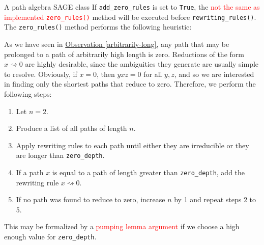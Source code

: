 \begin{chapter}{A path algebra SAGE class}
If \texttt{add\_zero\_rules} is set to \texttt{True}, the \textcolor{red}{not the same as implemented \texttt{zero\_rules()}} method will be executed before \texttt{rewriting\_rules()}. The \texttt{zero\_rules()} method performs the following heuristic:
\begin{heur} As we have seen in \hyperref[arbitrarily-long]{Observation \ref*{arbitrarily-long}},  any path that may be prolonged to a path of arbitrarily high length is zero. Reductions of the form $x\rightsquigarrow 0$ are highly desirable, since the ambiguities they generate are usually simple to resolve. Obviously, if $x=0$, then $yxz=0$ for all $y,z$, and so we are interested in finding only the shortest paths that reduce to zero. Therefore, we perform the following steps:
\begin{enumerate}
\item Let $n=2$.
\item Produce a list of all paths of length $n$.
\item Apply rewriting rules to each path until either they are irreducible or they are longer than \texttt{zero\_depth}.
\item If a path $x$ is equal to a path of length greater than \texttt{zero\_depth}, add the rewriting rule $x\rightsquigarrow 0$.
\item If no path was found to reduce to zero, increase $n$ by 1 and repeat steps 2 to 5.
\end{enumerate}
This may be formalized by a \textcolor{red}{pumping lemma argument} if we choose a high enough value for \texttt{zero\_depth}.


\end{heur}
\end{chapter}
